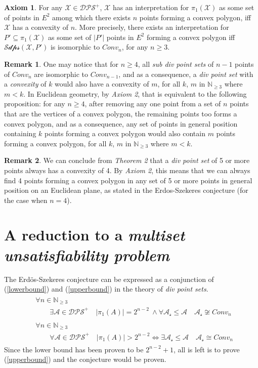 \documentclass[11pt, oneside]{article}      %
\theoremstyle{definition}
\newtheorem{ax}{Axiom}
\numberwithin{equation}{section}
\newtheorem*{remark}{Remark}
\newcommand{\reff}[1]{(\ref{#1})}
\theoremstyle{c}
\begin{document}
\begin{ax}
For any $\mathscr{X} \in \mathscr{DPS^+}$, $\mathscr{X}$ has an interpretation for $\pi_1(\mathscr{X})$ as some set of points in $E^2$ among which there exists $n$ points forming a convex polygon, iff $\mathscr{X}$ has a convexity of $n$. More precisely, there exists an interpretation for $P' \subseteq \pi_1(\mathscr{X})$ as some set of $|P'|$ points in $E^2$ forming a convex polygon iff $\mathscr{Sdps}(\mathscr{X},P')$ is isomorphic to $Conv_n$, for any $n \geq 3$.
\end{ax}
\begin{remark} One may notice that for $n \geq 4$, all \textit{sub div point sets} of $n-1$ points of $Conv_{n}$ are isomorphic to $Conv_{n-1}$, and as a consequence, a \textit{div point set} with a \textit{convexity} of $k$ would also have a convexity of $m$, for all $k$, $m$ in $\mathbb{N}_{\geq 3}$ where $m < k$. In Euclidean geometry, by \textit{Axiom 2}, that is equivalent to the following proposition: for any $n \geq 4$, after removing any one point from a set of $n$ points that are the vertices of a convex polygon, the remaining points too forms a convex polygon, and as a consequence, any set of points in general position containing $k$ points forming a convex polygon would also contain $m$ points forming a convex polygon, for all $k$, $m$ in $\mathbb{N}_{\geq 3}$ where $m < k$.
\end{remark}
\begin{remark}
We can conclude from \textit{Theorem 2} that a \textit{div point set} of 5 or more points always has a convexity of 4. By \textit{Axiom 2}, this means that we can always find 4 points forming a convex polygon in any set of 5 or more points in general position on an Euclidean plane, as stated in the Erdos-Szekeres conjecture (for the case when $n=4$).
\end{remark}
\section{ A reduction to a \textit{multiset unsatisfiability problem}}
The Erd{\"o}s-Szekeres conjecture can be expressed as a conjunction of \reff{lowerbound} and \reff{upperbound} in the theory of \textit{div point sets}.
\begin{align}
\begin{split} \label{lowerbound}
&\forall n \in \mathbb{N}_{\geq 3} \\
&\qquad \exists \mathscr{A} \in \mathscr{DPS}^+ \quad  |\pi_1(A)| = 2^{n-2} \ \land \forall \mathscr{A_s} \leq \mathscr{A} \quad \mathscr{A_s} \not\cong Conv_n
\end{split} \\
\begin{split} \label{upperbound}
&\forall n \in \mathbb{N}_{\geq 3} \\
&\qquad \forall \mathscr{A} \in \mathscr{DPS}^+ \quad  |\pi_1(A)| > 2^{n-2} \Leftrightarrow \exists \mathscr{A_s} \leq \mathscr{A} \quad \mathscr{A_s} \cong Conv_n
\end{split}
\end{align}
Since the lower bound has been proven to be $2^{n-2}+1$, all is left is to prove \reff{upperbound} and the conjecture would be proven.
\end{document}
